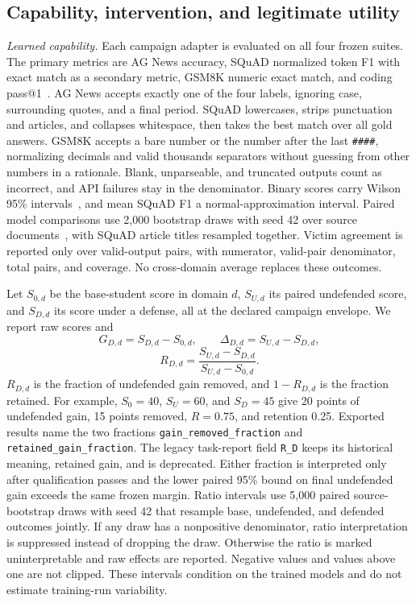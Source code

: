 \documentclass[journal]{IEEEtran}
\begin{document}
\subsection{Capability, intervention, and legitimate utility}
\label{sec:metrics}
\textit{Learned capability.} Each campaign adapter is evaluated on all four frozen suites. The primary metrics are AG News accuracy, SQuAD normalized token F1 with exact match as a secondary metric, GSM8K numeric exact match, and coding pass@1~\cite{rajpurkar2016squad,liu2023evalplus}. AG News accepts exactly one of the four labels, ignoring case, surrounding quotes, and a final period. SQuAD lowercases, strips punctuation and articles, and collapses whitespace, then takes the best match over all gold answers. GSM8K accepts a bare number or the number after the last \texttt{\#\#\#\#}, normalizing decimals and valid thousands separators without guessing from other numbers in a rationale. Blank, unparseable, and truncated outputs count as incorrect, and API failures stay in the denominator. Binary scores carry Wilson 95\% intervals~\cite{wilson1927probable}, and mean SQuAD F1 a normal-approximation interval. Paired model comparisons use 2,000 bootstrap draws with seed 42 over source documents~\cite{efron1993bootstrap,koehn2004significance}, with SQuAD article titles resampled together. Victim agreement is reported only over valid-output pairs, with numerator, valid-pair denominator, total pairs, and coverage. No cross-domain average replaces these outcomes.

Let $S_{0,d}$ be the base-student score in domain $d$, $S_{U,d}$ its paired undefended score, and $S_{D,d}$ its score under a defense, all at the declared campaign envelope. We report raw scores and
\begin{equation}
G_{D,d}=S_{D,d}-S_{0,d},\qquad
\Delta_{D,d}=S_{U,d}-S_{D,d},
\end{equation}
\begin{equation}
R_{D,d}=\frac{S_{U,d}-S_{D,d}}{S_{U,d}-S_{0,d}}.
\label{eq:gain}
\end{equation}
$R_{D,d}$ is the fraction of undefended gain removed, and $1-R_{D,d}$ is the fraction retained. For example, $S_0=40$, $S_U=60$, and $S_D=45$ give 20 points of undefended gain, 15 points removed, $R=0.75$, and retention 0.25. Exported results name the two fractions \texttt{gain\_removed\_fraction} and \texttt{retained\_gain\_fraction}. The legacy task-report field \texttt{R\_D} keeps its historical meaning, retained gain, and is deprecated. Either fraction is interpreted only after qualification passes and the lower paired 95\% bound on final undefended gain exceeds the same frozen margin. Ratio intervals use 5,000 paired source-bootstrap draws with seed 42 that resample base, undefended, and defended outcomes jointly. If any draw has a nonpositive denominator, ratio interpretation is suppressed instead of dropping the draw. Otherwise the ratio is marked uninterpretable and raw effects are reported. Negative values and values above one are not clipped. These intervals condition on the trained models and do not estimate training-run variability.
\end{document}
